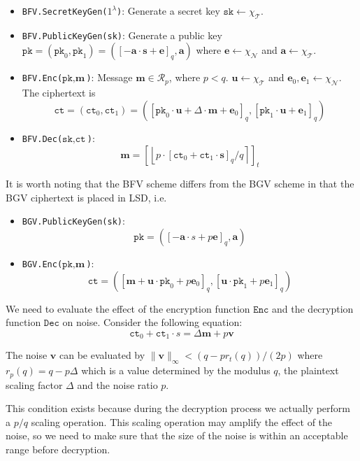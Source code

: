 \documentclass[11pt]{article}
\begin{document}
\begin{itemize}
\item \texttt{BFV.SecretKeyGen($1^\lambda$)}: Generate a secret key $\texttt{sk}\leftarrow \chi_\mathcal{T}$.
\item \texttt{BFV.PublicKeyGen(\texttt{sk})}: Generate a public key $\texttt{pk} =(\texttt{pk}_0,\texttt{pk}_1)= \left([-\mathbf{a}\cdot\mathbf{s}+\mathbf{e}]_{q}, \mathbf{a}\right)$ where $\mathbf{e}\leftarrow \chi_\mathcal{N}$ and $\mathbf{a}\leftarrow \chi_\mathcal{T}$.
\item \texttt{BFV.Enc($\texttt{pk},\textbf{m}$)}: Message $\mathbf{m}\in \mathcal{R}_p$, where $p<q$. $\mathbf{u}\leftarrow \chi_\mathcal{T}$ and $\mathbf{e}_0, \mathbf{e}_1\leftarrow \chi_\mathcal{N}$. The ciphertext is $$\texttt{ct} = (\texttt{ct}_0,\texttt{ct}_1)=\left([\texttt{pk}_0\cdot\mathbf{u}+\Delta\cdot\mathbf{m}+\mathbf{e}_0]_{q},[\texttt{pk}_1\cdot\mathbf{u}+\mathbf{e}_1]_{q}\right)$$
\item \texttt{BFV.Dec($\texttt{sk},\texttt{ct}$)}: $$\mathbf{m}=\left[\left\lfloor p\cdot[\texttt{ct}_0+\texttt{ct}_1\cdot\mathbf{s}]_q/q\right\rceil\right]_t$$
\end{itemize}
It is worth noting that the BFV scheme differs from the BGV scheme in that the BGV ciphertext is placed in LSD, i.e.
\begin{itemize}
\item \texttt{BGV.PublicKeyGen(\texttt{sk})}: $$\texttt{pk}=([-\mathbf{a}\cdot{s}+p\mathbf{e}]_q, \mathbf{a})$$
\item \texttt{BGV.Enc($\texttt{pk},\textbf{m}$)}: $$\texttt{ct}=([ \mathbf{m}+\mathbf{u}\cdot\texttt{pk}_0+p\mathbf{e}_0]_q,[\mathbf{u}\cdot\texttt{pk}_1+p\mathbf{e}_1]_q)$$
\end{itemize}
We need to evaluate the effect of the encryption function $\texttt{Enc}$ and the decryption function $\texttt{Dec}$ on noise. Consider the following equation:
\begin{equation}
\texttt{ct}_0+\texttt{ct}_1\cdot{s}=\Delta\mathbf{m}+p\mathbf{v}
\end{equation}

The noise $\mathbf{v}$ can be evaluated by $\lVert\mathbf{v}\rVert_\infty < (q-p r_t(q))/(2p)$ where $r_p(q)=q-p\Delta$ which is a value determined by the modulus $q$, the plaintext scaling factor $\Delta$ and the noise ratio $p$.

This condition exists because during the decryption process we actually perform a $p/q$ scaling operation. This scaling operation may amplify the effect of the noise, so we need to make sure that the size of the noise is within an acceptable range before decryption.
\end{document}
